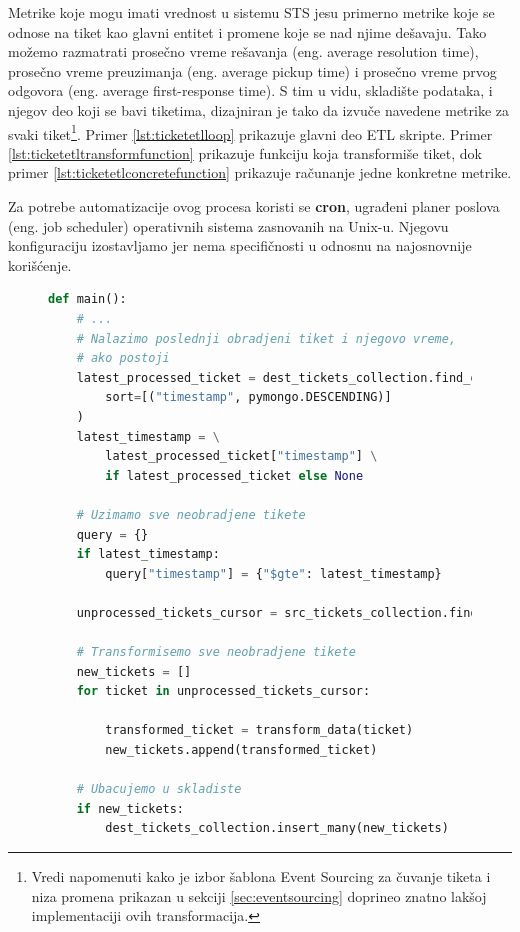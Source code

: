 \documentclass[12pt,oneside]{memoir}
\begin{document}
Metrike koje mogu imati vrednost u sistemu STS jesu primerno metrike koje se odnose na tiket kao glavni entitet i promene koje se nad njime dešavaju. Tako možemo razmatrati prosečno vreme rešavanja (eng. average resolution time), prosečno vreme preuzimanja (eng. average pickup time) i prosečno vreme prvog odgovora (eng. average first-response time). S tim u vidu, skladište podataka, i njegov deo koji se bavi tiketima, dizajniran je tako da izvuče navedene metrike za svaki tiket\footnote{Vredi napomenuti kako je izbor šablona Event Sourcing za čuvanje tiketa i niza promena prikazan u sekciji \ref{sec:eventsourcing} doprineo znatno lakšoj implementaciji ovih transformacija.}. Primer \ref{lst:ticketetlloop} prikazuje glavni deo ETL skripte. Primer \ref{lst:ticketetltransformfunction} prikazuje funkciju koja transformiše tiket, dok primer \ref{lst:ticketetlconcretefunction} prikazuje računanje jedne konkretne metrike.

Za potrebe automatizacije ovog procesa koristi se \textbf{cron}, ugrađeni planer poslova (eng. job scheduler) operativnih sistema zasnovanih na Unix-u. Njegovu konfiguraciju izostavljamo jer nema specifičnosti u odnosnu na najosnovnije korišćenje.

\begin{figure}[h]
\begin{lstlisting}[language=python, caption={Transformacija tiketa.}, label={lst:ticketetlloop}]
def main():
    # ...
    # Nalazimo poslednji obradjeni tiket i njegovo vreme,
    # ako postoji
    latest_processed_ticket = dest_tickets_collection.find_one(
        sort=[("timestamp", pymongo.DESCENDING)]
    )
    latest_timestamp = \
        latest_processed_ticket["timestamp"] \
        if latest_processed_ticket else None

    # Uzimamo sve neobradjene tikete
    query = {}
    if latest_timestamp:
        query["timestamp"] = {"$gte": latest_timestamp}

    unprocessed_tickets_cursor = src_tickets_collection.find(query)

    # Transformisemo sve neobradjene tikete
    new_tickets = []
    for ticket in unprocessed_tickets_cursor:
        
        transformed_ticket = transform_data(ticket)
        new_tickets.append(transformed_ticket)

    # Ubacujemo u skladiste
    if new_tickets:
        dest_tickets_collection.insert_many(new_tickets)
\end{lstlisting}
\end{figure}
\end{document}
